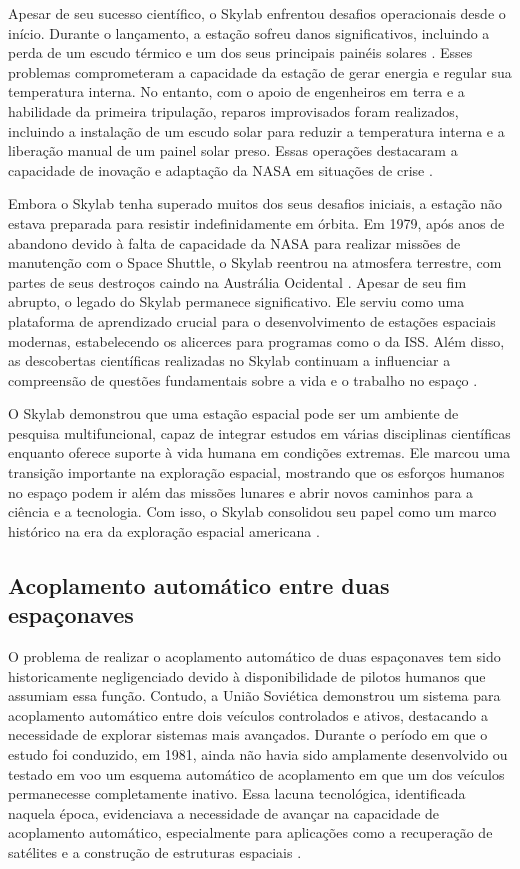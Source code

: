 Apesar de seu sucesso científico, o Skylab enfrentou desafios operacionais desde o início. Durante o lançamento, a estação sofreu danos significativos, incluindo a perda de um escudo térmico e um dos seus principais painéis solares \cite{nasaSkylab2}. Esses problemas comprometeram a capacidade da estação de gerar energia e regular sua temperatura interna. No entanto, com o apoio de engenheiros em terra e a habilidade da primeira tripulação, reparos improvisados foram realizados, incluindo a instalação de um escudo solar para reduzir a temperatura interna e a liberação manual de um painel solar preso. Essas operações destacaram a capacidade de inovação e adaptação da NASA em situações de crise \cite{nasaSkylab}.

Embora o Skylab tenha superado muitos dos seus desafios iniciais, a estação não estava preparada para resistir indefinidamente em órbita. Em 1979, após anos de abandono devido à falta de capacidade da NASA para realizar missões de manutenção com o Space Shuttle, o Skylab reentrou na atmosfera terrestre, com partes de seus destroços caindo na Austrália Ocidental \cite{nasaSkylabReentry}. Apesar de seu fim abrupto, o legado do Skylab permanece significativo. Ele serviu como uma plataforma de aprendizado crucial para o desenvolvimento de estações espaciais modernas, estabelecendo os alicerces para programas como o da ISS. Além disso, as descobertas científicas realizadas no Skylab continuam a influenciar a compreensão de questões fundamentais sobre a vida e o trabalho no espaço \cite{nasaSkylab}.

O Skylab demonstrou que uma estação espacial pode ser um ambiente de pesquisa multifuncional, capaz de integrar estudos em várias disciplinas científicas enquanto oferece suporte à vida humana em condições extremas. Ele marcou uma transição importante na exploração espacial, mostrando que os esforços humanos no espaço podem ir além das missões lunares e abrir novos caminhos para a ciência e a tecnologia. Com isso, o Skylab consolidou seu papel como um marco histórico na era da exploração espacial americana \cite{nasaSkylab}.

\subsection{Acoplamento automático entre duas espaçonaves}

O problema de realizar o acoplamento automático de duas espaçonaves tem sido historicamente negligenciado devido à disponibilidade de pilotos humanos que assumiam essa função. Contudo, a União Soviética demonstrou um sistema para acoplamento automático entre dois veículos controlados e ativos, destacando a necessidade de explorar sistemas mais avançados. Durante o período em que o estudo foi conduzido, em 1981, ainda não havia sido amplamente desenvolvido ou testado em voo um esquema automático de acoplamento em que um dos veículos permanecesse completamente inativo. Essa lacuna tecnológica, identificada naquela época, evidenciava a necessidade de avançar na capacidade de acoplamento automático, especialmente para aplicações como a recuperação de satélites e a construção de estruturas espaciais \cite{micheal1981}.

